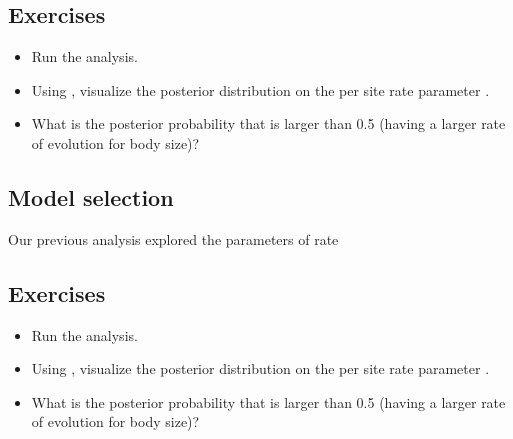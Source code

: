 \subsection*{Exercises}

\begin{itemize}
\item
Run the analysis.
\item
Using , visualize the posterior distribution on the per site rate parameter .
\item 
What is the posterior probability that  is larger than 0.5 (\IE having a larger rate of evolution for body size)?
\end{itemize}

\vspace{5cm}



\subsection{Model selection}
Our previous analysis explored the parameters of rate


\subsection*{Exercises}

\begin{itemize}
\item
Run the analysis.
\item
Using , visualize the posterior distribution on the per site rate parameter .
\item 
What is the posterior probability that  is larger than 0.5 (\IE having a larger rate of evolution for body size)?
\end{itemize}

\vspace{5cm}


